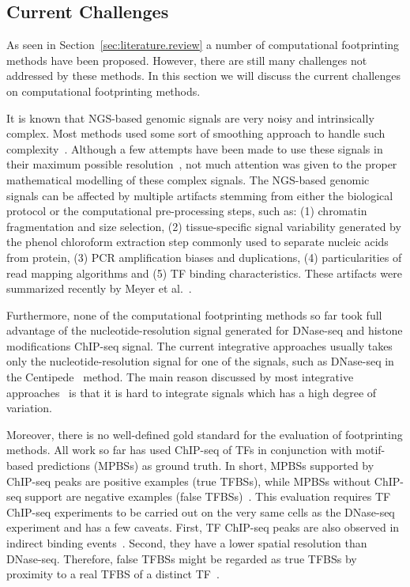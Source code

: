 \subsection{Current Challenges}
\label{sec:current.challenges}

As seen in Section~\ref{sec:literature.review} a number of computational footprinting methods have been proposed. However, there are still many challenges not addressed by these methods. In this section we will discuss the current challenges on computational footprinting methods.

It is known that NGS-based genomic signals are very noisy and intrinsically complex. Most methods used some sort of smoothing approach to handle such complexity~\cite{pique2011,cuellar2012,sherwood2014,kahara2015}. Although a few attempts have been made to use these signals in their maximum possible resolution~\cite{boyle2011,sung2014}, not much attention was given to the proper mathematical modelling of these complex signals. The NGS-based genomic signals can be affected by multiple artifacts stemming from either the biological protocol or the computational pre-processing steps, such as: (1) chromatin fragmentation and size selection, (2) tissue-specific signal variability generated by the phenol chloroform extraction step commonly used to separate nucleic acids from protein, (3) PCR amplification biases and duplications, (4) particularities of read mapping algorithms and (5) TF binding characteristics. These artifacts were summarized recently by Meyer et al.~\cite{meyer2014}.

Furthermore, none of the computational footprinting methods so far took full advantage of the nucleotide-resolution signal generated for DNase-seq and histone modifications ChIP-seq signal. The current integrative approaches usually takes only the nucleotide-resolution signal for one of the signals, such as DNase-seq in the Centipede~\cite{pique2011} method. The main reason discussed by most integrative approaches~\cite{pique2011,cuellar2012} is that it is hard to integrate signals which has a high degree of variation.

Moreover, there is no well-defined gold standard for the evaluation of footprinting methods. All work so far has used ChIP-seq of TFs in conjunction with motif-based predictions (MPBSs) as ground truth. In short, MPBSs supported by ChIP-seq peaks are positive examples (true TFBSs), while MPBSs without ChIP-seq support are negative examples (false TFBSs)~\cite{cuellar2012}. This evaluation requires TF ChIP-seq experiments to be carried out on the very same cells as the DNase-seq experiment and has a few caveats. First, TF ChIP-seq peaks are also observed in indirect binding events~\cite{yardimci2014}. Second, they have a lower spatial resolution than DNase-seq. Therefore, false TFBSs might be regarded as true TFBSs by proximity to a real TFBS of a distinct TF~\cite{cuellar2012,yardimci2014}.

